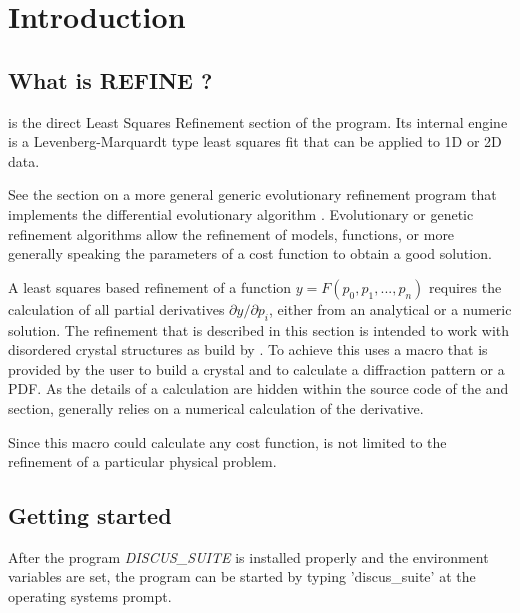 
\chapter{Introduction \label{intro}}
\section{What is REFINE ?}

\Refine is the direct Least Squares Refinement section of the
\href{./suite\_man.pdf}\Suite program. Its internal engine is a 
Levenberg-Marquardt
type least squares fit that can be applied to 1D or 2D data.

See the \href{./diffev\_man.pdf}\Diffev section on a more general 
generic evolutionary refinement program that implements the
differential evolutionary algorithm \cite{prstla2005}. Evolutionary or
genetic refinement algorithms allow the refinement of models, functions,
or more generally speaking the parameters of a cost function to obtain
a good solution. 

A least squares based refinement of a function 
$y = F(p_{0}, p_{1}, ..., p_{n})$ requires the calculation of all
partial derivatives $\partial y/ \partial p_{i}$, either from an 
analytical or a numeric solution. 
The refinement that is described in this section is intended to
work with disordered crystal structures as build by \Discus. 
To achieve this \Refine uses a macro that is provided by the user
to build a crystal and to calculate a diffraction pattern or a
PDF.  As the details of a calculation are hidden within the 
source code of the \Discus and \Kuplot section, \Refine
generally relies on a numerical calculation of the derivative. 

Since this macro could calculate any cost function, 
\Refine is not limited to the refinement of a particular physical
problem. 


\section{Getting started \label{intro-get}}

After the program {\it DISCUS\_SUITE} is installed properly and the
environment variables are set, the program can be started by typing
'discus\_suite' at the operating systems prompt.


